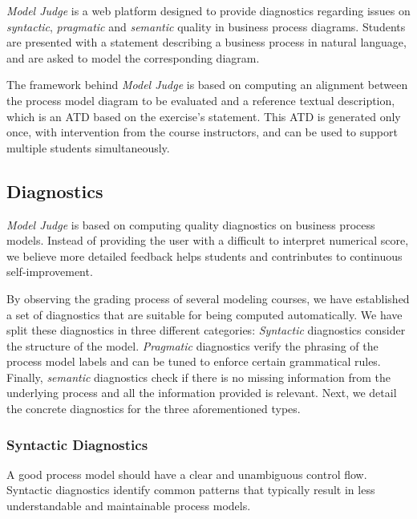 
\emph{Model Judge} is a web platform designed to provide diagnostics regarding
issues on \emph{syntactic}, \emph{pragmatic} and \emph{semantic} quality in
business process diagrams. Students are presented with a statement describing a
business process in natural language, and are asked to model the corresponding
diagram.

The framework behind \emph{Model Judge} is based on computing an alignment
between the process model diagram to be evaluated and a reference textual
description, which is an ATD based on the exercise's statement. This ATD is
generated only once, with intervention from the course instructors, and can be
used to support multiple students simultaneously.


\subsection{Diagnostics}

\emph{Model Judge} is based on computing quality diagnostics on business process
models. Instead of providing the user with a difficult to interpret numerical
score, we believe more detailed feedback helps students and contrinbutes to
continuous self-improvement.

By observing the grading process of several modeling courses, we have
established a set of diagnostics that are suitable for being computed
automatically. We have split these diagnostics in three different categories:
\emph{Syntactic} diagnostics consider the structure of the model.
\emph{Pragmatic} diagnostics verify the phrasing of the process model labels and
can be tuned to enforce certain grammatical rules. Finally, \emph{semantic}
diagnostics check if there is no missing information from the underlying process
and all the information provided is relevant. Next, we detail the concrete
diagnostics for the three aforementioned types.

\subsubsection{Syntactic Diagnostics}

A good process model should have a clear and unambiguous control flow.
Syntactic diagnostics identify common patterns that typically result in
less understandable and maintainable process models.

